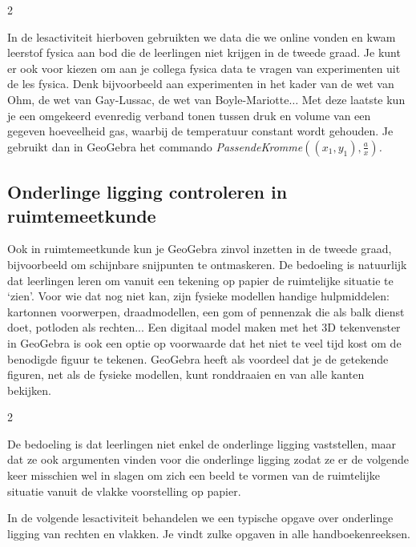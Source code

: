 \begin{multicols}{2}

In de lesactiviteit hierboven gebruikten we data die we online vonden en kwam leerstof fysica aan bod die de leerlingen niet krijgen in de tweede graad. Je kunt er ook voor kiezen om aan je collega fysica data te vragen van experimenten uit de les fysica. Denk bijvoorbeeld aan experimenten in het kader van de wet van Ohm, de wet van Gay-Lussac, de wet van Boyle-Mariotte$\ldots$ Met deze laatste kun je een omgekeerd evenredig verband tonen tussen druk en volume van een gegeven hoeveelheid gas, waarbij de temperatuur constant wordt gehouden. Je gebruikt dan in GeoGebra het commando \emph{PassendeKromme$\displaystyle ((x_1,y_1),\frac{a}{x})$.} 

\subsection{Onderlinge ligging controleren in ruimtemeetkunde}

Ook in ruimtemeetkunde kun je  GeoGebra zinvol inzetten in de tweede graad, bijvoorbeeld om schijnbare snijpunten te ontmaskeren. De bedoeling is natuurlijk dat leerlingen leren om vanuit een tekening op papier de ruimtelijke situatie te `zien'. Voor wie dat nog niet kan, zijn fysieke modellen handige hulpmiddelen: kartonnen voorwerpen, draadmodellen, een gom of pennenzak die als balk dienst doet, potloden als rechten... Een digitaal model maken met het 3D tekenvenster in GeoGebra is ook een optie op voorwaarde dat het niet te veel tijd kost om de benodigde figuur te tekenen. GeoGebra heeft als voordeel dat je de getekende figuren, net als de fysieke modellen, kunt ronddraaien en van alle kanten bekijken. 
\end{multicols}
\begin{multicols}{2}

De bedoeling is dat leerlingen niet enkel de onderlinge ligging vaststellen, maar dat ze ook argumenten vinden voor die onderlinge ligging zodat ze er de volgende keer misschien wel in slagen om zich een beeld te vormen van de ruimtelijke situatie vanuit de vlakke voorstelling op papier.

In de volgende lesactiviteit behandelen we een typische opgave over onderlinge ligging van rechten en vlakken. Je vindt zulke opgaven in alle handboekenreeksen.

\end{multicols}

